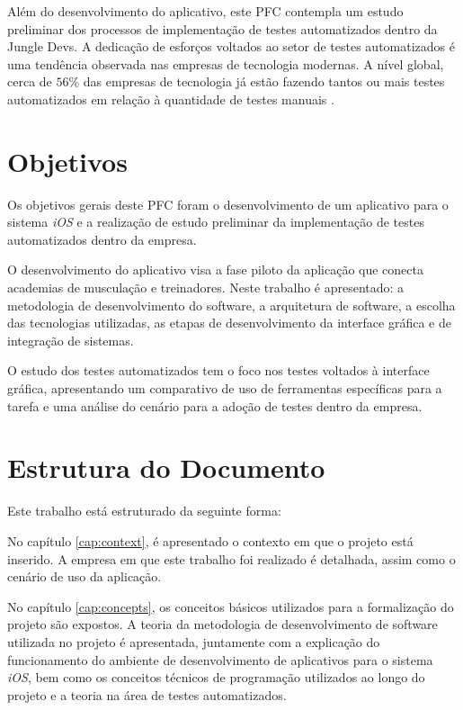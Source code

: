 Além do desenvolvimento do aplicativo, este PFC contempla um estudo preliminar dos processos de implementação de testes automatizados dentro da Jungle Devs. A dedicação de esforços voltados ao setor de testes automatizados é uma tendência observada nas empresas de tecnologia modernas. A nível global, cerca de $56\%$ das empresas de tecnologia já estão fazendo tantos ou mais testes automatizados em relação à quantidade de testes manuais \cite{tests-trends}. 

\section{Objetivos}
Os objetivos gerais deste PFC foram o desenvolvimento de um aplicativo para o sistema \textit{iOS} e a realização de estudo preliminar da implementação de testes automatizados dentro da empresa. 

O desenvolvimento do aplicativo visa a fase piloto da aplicação que conecta academias de musculação e treinadores. Neste trabalho é apresentado: a metodologia de desenvolvimento do software, a arquitetura de software, a escolha das tecnologias utilizadas, as etapas de desenvolvimento da interface gráfica e de integração de sistemas. 

O estudo dos testes automatizados tem o foco nos testes voltados à interface gráfica, apresentando um comparativo de uso de ferramentas específicas para a tarefa e uma análise do cenário para a adoção de testes dentro da empresa.

\section{Estrutura do Documento}
Este trabalho está estruturado da seguinte forma: 

No capítulo \ref{cap:context}, é apresentado o contexto em que o projeto está inserido. A empresa em que este trabalho foi realizado é detalhada, assim como o cenário de uso da aplicação.

No capítulo \ref{cap:concepts}, os conceitos básicos utilizados para a formalização do projeto são expostos. A teoria da metodologia de desenvolvimento de software utilizada no projeto é apresentada, juntamente com a explicação do funcionamento do ambiente de desenvolvimento de aplicativos para o sistema \textit{iOS}, bem como os conceitos técnicos de programação utilizados ao longo do projeto e a teoria na área de testes automatizados.

